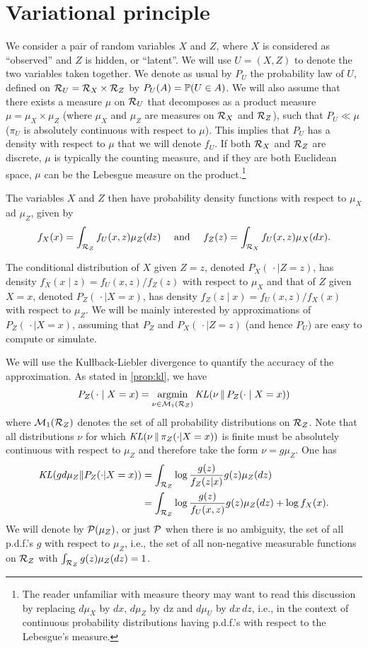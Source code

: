 \section{Variational principle}
\label{sec:var.principle}
We  consider a pair of random variables $X$ and $Z$, where $X$ is considered as ``observed'' and $Z$ is hidden, or ``latent''. We will use $U = (X,Z)$ to denote the two variables taken together. We denote as usual by $P_U$ the probability law of $U$, defined on ${\mathcal R}_U = {\mathcal R}_X \times {\mathcal R}_Z$ by $P_U(A)= \bm{\mathbb P}(U\in A)$. We will also assume that there exists a measure $\mu$ on ${\mathcal R}_U$ that decomposes as a product measure $\mu = \mu_X \times \mu_Z$ (where $\mu_X$ and $\mu_Z$ are measures on ${\mathcal R}_X$ and ${\mathcal R}_Z$), such that  $P_U \ll \mu$ ($\pi_U$ is absolutely continuous with respect to $\mu$). This implies that $P_U$ has a density with respect to $\mu$ that we will denote $f_U$. If both ${\mathcal R}_X$ and ${\mathcal R}_Z$ are discrete, $\mu$ is typically the counting measure, and if they are both Euclidean space, $\mu$ can be the Lebesgue measure on the product.\footnote{The reader unfamiliar with measure theory may want to read this discussion by replacing $d\mu_X$ by $dx$, $d\mu_Z$ by dz and $d\mu_U$ by $dx\,dz$, i.e., in the context of continuous probability distributions having p.d.f.'s with respect to the Lebesgue's measure.}

The variables $X$ and $Z$ then have probability density functions with respect to $\mu_X$ ad $\mu_Z$, given by
\[
f_X(x) = \int_{{\mathcal R}_Z} f_U(x,z) \mu_Z(dz) \quad \text{ and } \quad f_Z(z) = \int_{{\mathcal R}_X} f_U(x,z) \mu_X(dx).
\]

The conditional distribution of $X$ given $Z=z$, denoted $P_X(\,\cdot\mid Z=z)$, has density $f_X(x\mid z) = f_U(x,z)/f_Z(z)$ with respect to $\mu_X$ and that of $Z$ given $X=x$, denoted  $P_Z(\,\cdot\mid X=x)$, has density $f_Z(z\mid x) = f_U(x,z) / f_X(x)$ with respect to $\mu_Z$. 
We will be mainly interested by approximations of $P_Z(\,\cdot\mid X=x)$, assuming that $P_Z$ and $P_X(\,\cdot\mid Z=z)$ (and hence $P_U$) are easy to compute or simulate. 


We will use the Kullback-Liebler divergence to quantify the accuracy of the approximation. As stated in \cref{prop:kl}, we have
\[
P_Z(\,\cdot\mid X=x) = \operatorname*{argmin}_{\nu\in  \mathcal M_1({\mathcal R}_Z)} \mathit{KL}(\nu\, \|\, P_Z(\cdot\mid X=x))
\]
where $\mathcal M_1({\mathcal R}_Z)$ denotes the set of all probability distributions on ${\mathcal R}_Z$. Note that all distributions $\nu$ for which $\mathit{KL}(\nu\,\|\,\pi_Z(\cdot|X=x))$ is finite must be absolutely continuous with respect to $\mu_Z$ and therefore take the form $\nu = g \mu_Z$. One   has
\begin{align}
\nonumber
\mathit{KL}(gd\mu_Z\|P_Z(\cdot|X=x)) &= \int_{{\mathcal R}_Z} \log \frac{g(z)}{f_Z(z|x)} g(z) \mu_Z(dz) \\
\label{eq:variational.b}
&= \int_{{\mathcal R}_Z} \log \frac{g(z)}{f_U(x,z)} g(z) \mu_Z(dz) + \log f_X(x).
\end{align}
We will denote by ${\mathcal P}(\mu_Z)$, or just ${\mathcal P}$ when there is no ambiguity, the set of all p.d.f.'s $g$ with respect to $\mu_Z$, i.e., the set of all non-negative measurable functions on ${\mathcal R}_Z$ with $\int_{{\mathcal R}_Z} g(z) \mu_Z(dz) = 1$.


